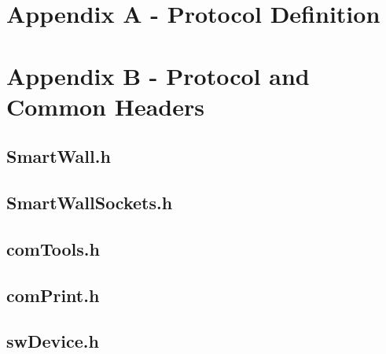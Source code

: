 \documentclass[12pt]{article}
\begin{document}
\pagebreak

\section{Appendix A - Protocol Definition}
\label{sec:AppendixA}



\pagebreak

\section{Appendix B - Protocol and Common Headers}
\label{sec:AppendixB}

\pagebreak

\subsection{SmartWall.h}
\label{sec:AppendixB.SmartWall.h}


\pagebreak

\subsection{SmartWallSockets.h}
\label{sec:AppendixB.SmartWallSockets.h}


\pagebreak

\subsection{comTools.h}
\label{sec:AppendixB.comTools.h}


\pagebreak

\subsection{comPrint.h}
\label{sec:AppendixB.comPrint.h}


\pagebreak

\subsection{swDevice.h}
\label{sec:AppendixB.swDevice.h}

\end{document}
